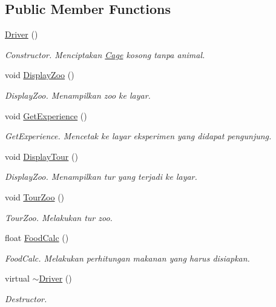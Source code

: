 \subsection*{Public Member Functions}
\begin{DoxyCompactItemize}
\item 
\hyperlink{classDriver_af0658d103e3e810a8e9ef0a53bb2e261}{Driver} ()
\begin{DoxyCompactList}\small\item\em Constructor. Menciptakan \hyperlink{classCage}{Cage} kosong tanpa animal. \end{DoxyCompactList}\item 
void \hyperlink{classDriver_aa8b4e139b99aad4720ce86286783dcdb}{Display\+Zoo} ()
\begin{DoxyCompactList}\small\item\em Display\+Zoo. Menampilkan zoo ke layar. \end{DoxyCompactList}\item 
void \hyperlink{classDriver_a2bc17a8251eab4cfdb7d74c7f7299c6e}{Get\+Experience} ()
\begin{DoxyCompactList}\small\item\em Get\+Experience. Mencetak ke layar eksperimen yang didapat pengunjung. \end{DoxyCompactList}\item 
void \hyperlink{classDriver_af3677b3b6adc2ccc5d486be1e4462fba}{Display\+Tour} ()
\begin{DoxyCompactList}\small\item\em Display\+Zoo. Menampilkan tur yang terjadi ke layar. \end{DoxyCompactList}\item 
void \hyperlink{classDriver_aa56ed0eaa789f78765708e15032d6534}{Tour\+Zoo} ()
\begin{DoxyCompactList}\small\item\em Tour\+Zoo. Melakukan tur zoo. \end{DoxyCompactList}\item 
float \hyperlink{classDriver_a0f85e40efd4983b0434307ca0647f378}{Food\+Calc} ()
\begin{DoxyCompactList}\small\item\em Food\+Calc. Melakukan perhitungan makanan yang harus disiapkan. \end{DoxyCompactList}\item 
virtual \hyperlink{classDriver_a2864fd05273f30e23aa959c92ef8a5b9}{$\sim$\+Driver} ()
\begin{DoxyCompactList}\small\item\em Destructor. \end{DoxyCompactList}\item 

\end{DoxyCompactItemize}
